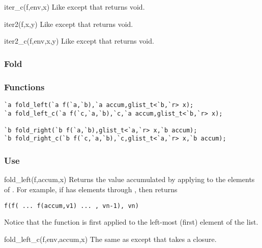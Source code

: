 \begin{defun}{iter_c}{(f,env,x)}
Like  except that  returns
void.
\end{defun}

\begin{defun}{iter2}{(f,x,y)}
Like  except that  returns
void.
\end{defun}

\begin{defun}{iter2_c}{(f,env,x,y)}
Like  except that 
returns void.
\end{defun}


\subsubsection*{Fold}
\subsubsection*{Functions}
\begin{verbatim}
`a fold_left(`a f(`a,`b),`a accum,glist_t<`b,`r> x);
`a fold_left_c(`a f(`c,`a,`b),`c,`a accum,glist_t<`b,`r> x);

`b fold_right(`b f(`a,`b),glist_t<`a,`r> x,`b accum);
`b fold_right_c(`b f(`c,`a,`b),`c,glist_t<`a,`r> x,`b accum);
\end{verbatim}

\subsubsection*{Use}

\begin{defun}{fold_left}{(f,accum,x)}
Returns the value accumulated by applying  to the elements of
.  For example, if  has elements  through
, then  returns

\begin{verbatim}
f(f( ... f(accum,v1) ... , vn-1), vn)
\end{verbatim}

\noindent Notice that the function is first applied to the left-most (first)
element of the list.
\end{defun}

\begin{defun}{fold_left_c}{(f,env,accum,x)}
The same as  except that  takes a closure.
\end{defun}

